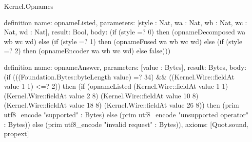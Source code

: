 \begin{lexlean}{Kernel.Opnames}
\begin{semanticmodule}
definition{
  name: opnameListed,
  parameters: [style : Nat, wa : Nat, wb : Nat, wc : Nat, wd : Nat],
  result: Bool,
  body: (if (style =? 0) then (opnameDecomposed wa wb wc wd) else (if (style =? 1) then (opnameFused wa wb wc wd) else (if (style =? 2) then (opnameEncoder wa wb wc wd) else false)))
}

definition{
  name: opnameAnswer,
  parameters: [value : Bytes],
  result: Bytes,
  body: (if (((Foundation.Bytes::byteLength value) =? 34) && ((Kernel.Wire::fieldAt value 1 1) <=? 2)) then (if (opnameListed (Kernel.Wire::fieldAt value 1 1) (Kernel.Wire::fieldAt value 2 8) (Kernel.Wire::fieldAt value 10 8) (Kernel.Wire::fieldAt value 18 8) (Kernel.Wire::fieldAt value 26 8)) then (prim utf8_encode "supported" : Bytes) else (prim utf8_encode "unsupported operator" : Bytes)) else (prim utf8_encode "invalid request" : Bytes)),
  axioms: [Quot.sound, propext]
}
\end{semanticmodule}
\end{lexlean}
